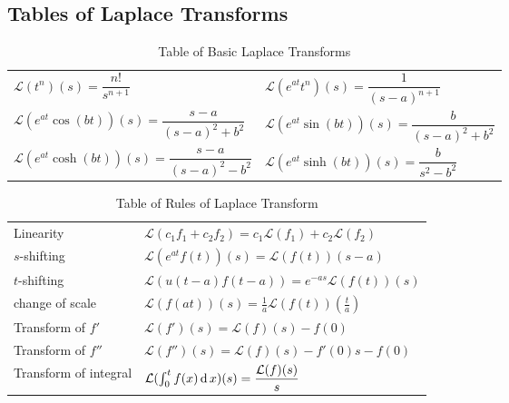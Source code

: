   

\subsection*{Tables of Laplace Transforms}

\begin{table}[htb]
    \centering
    \begin{tabular}{l|l}
    \hline
        $\mathcal{L}\left(t^{n}\right)(s)=\dfrac{n !}{s^{n+1}}$ &
        $\mathcal{L}\left(e^{a t}t^n\right)(s)=\dfrac{1}{(s-a)^{n+1}}$ \\[0.5em]
        $\mathcal{L}\left(e^{a t}\cos(b t)\right)(s)=\dfrac{s-a}{(s-a)^{2}+b^{2}}$ &
        $\mathcal{L}\left(e^{a t}\sin(b t)\right)(s)=\dfrac{b}{(s-a)^{2}+b^{2}}$ \\[0.5em]
        $\mathcal{L}\left(e^{a t}\cosh(b t)\right)(s)=\dfrac{s-a}{(s-a)^{2}-b^{2}}$ &
        $\mathcal{L}\left(e^{a t}\sinh(b t)\right)(s)=\dfrac{b}{s^{2}-b^{2}}$ \\[0.5em]
        \hline
\end{tabular}
    \caption{Table of Basic Laplace Transforms}
    \label{tab:LaplaceBasic}
\end{table}

\begin{table}[htb]
    \centering
    \begin{tabular}{l|l}
    \hline
        Linearity & $\mathcal{L}(c_1f_1+c_2f_2)=c_1\mathcal{L}(f_1) + c_2\mathcal{L}(f_2)$ \\[0.5em]
        $s$-shifting & $\mathcal{L}(e^{at}f(t))(s)=\mathcal{L}(f(t))(s-a)$ \\[0.5em]
        $t$-shifting & $\mathcal{L}(u(t-a)f(t-a))=e^{-as}\mathcal{L}(f(t))(s)$ \\[0.5em]
        change of scale & $\mathcal{L}(f(at))(s)=\frac1a\mathcal{L}(f(t))\left(\frac ta\right)$\\[0.5em]
        Transform of $f'$ & $\mathcal{L}(f')(s)=\mathcal{L}(f)(s)-f(0)$ \\[0.5em]
        Transform of $f''$ & $\mathcal{L}(f'')(s)=\mathcal{L}(f)(s)-f'(0)s-f(0)$ \\[0.5em]
        Transform of integral & $\mathcal{L}(\int_0^tf(x)\operatorname{d} x)(s)=\dfrac{\mathcal{L}(f)(s)}{s}$ \\[0.5em]
        \hline
\end{tabular}
    \caption{Table of Rules of Laplace Transform}
    \label{tab:LaplaceRules}
\end{table}


